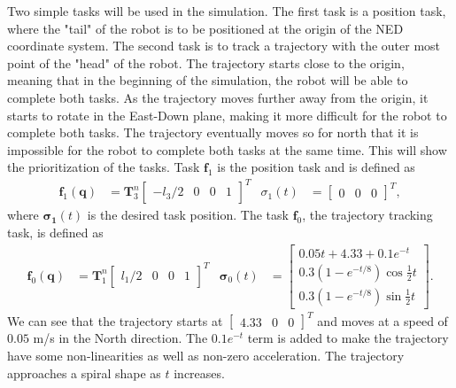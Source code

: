 Two simple tasks will be used in the simulation. The first task is a position
task, where the "tail" of the robot is to be positioned at the origin of the
NED coordinate system. The second task is to track a trajectory with the outer
most point of the "head" of the robot. The trajectory starts close to the origin,
meaning that in the beginning of the simulation, the robot will be able to
complete both tasks. As the trajectory moves further away from the origin, it
starts to rotate in the East-Down plane, making it more difficult for the robot
to complete both tasks. The trajectory eventually moves so for north that it
is impossible for the robot to complete both tasks at the same time. This
will show the prioritization of the tasks. Task $\bm{f}_1$ is the position task
and is defined as
\begin{align}
    \bm{f}_1(\bm{q}) &= \bm{T}_3^n \begin{bmatrix} -l_3/2 & 0 & 0 & 1 \end{bmatrix}^T &
        \sigma_1(t) &= \begin{bmatrix} 0 & 0 & 0 \end{bmatrix}^T,
\end{align}
where $\bm{\sigma_1}(t)$ is the desired task position. The task $\bm{f}_0$, the
trajectory tracking task, is defined as
\begin{align}
    \bm{f}_0(\bm{q}) &= \bm{T}_1^n \begin{bmatrix} l_1/2 & 0 & 0 & 1 \end{bmatrix}^T &
        \bm{\sigma}_0(t) &= \begin{bmatrix}
            0.05t + 4.33 + 0.1e^{-t} \\
            0.3 \left(1-e^{-t/8}\right)\cos{\frac{1}{2}t} \\
            0.3 \left(1-e^{-t/8}\right)\sin{\frac{1}{2}t}
        \end{bmatrix}.
\end{align}
We can see that the trajectory starts at $\begin{bmatrix} 4.33 & 0 & 0 \end{bmatrix}^T$
and moves at a speed of $0.05$ m/s in the North direction. The $0.1e^{-t}$ term
is added to make the trajectory have some non-linearities as well as
non-zero acceleration. The trajectory approaches a spiral shape as $t$ increases.

